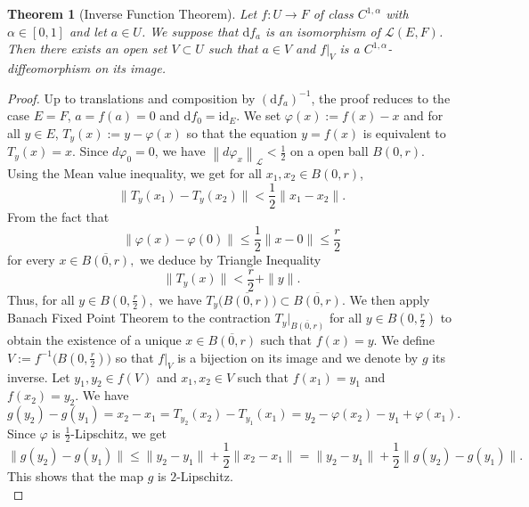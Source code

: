 \documentclass[11pt,reqno,a4paper]{article}%
\newtheorem{theorem}{Theorem}[section]
\theoremstyle{definition}
\theoremstyle{remark}
\renewcommand{\leq}{\leqslant}
\newcommand{\opnorm}[1]{{\left\| #1 \right\|}_{\mathcal{L}}}
\renewcommand{\d}{\mathrm{d}}
\renewcommand{\d}{\mathrm{d}}
\begin{document}
\begin{theorem}[Inverse Function Theorem] \label{theo: inverse_function}
    Let $f : U \to F$ of class $C^{1,\alpha}$ with $\alpha \in [ 0 , 1]$ and let $a \in U$. We suppose that $\d f_a$ is an isomorphism of $\mathscr{L}(E,F)$. Then there exists an open set $V \subset U$ such that $a \in V$ and $f \vert_V$ is a $C^{1,\alpha}$-diffeomorphism on its image.
\end{theorem}

\begin{proof}
    Up to translations and composition by $ (\d f_a)^{-1} $, the proof reduces to the case $E = F$, $a = f(a) = 0$ and $\d f_0 = \mathrm{id}_E$.
    We set $\varphi(x) := f(x) - x$ and for all $y \in E$, $T_y(x) := y - \varphi(x)$ so that the equation $y = f(x)$ is equivalent to $T_y(x) = x.$
    Since $d\varphi_0 = 0$, we have $ \opnorm{ d\varphi_x } < \frac{1}{2}$ on a open ball $B(0,r)$. Using the Mean value inequality, we get for all $x_1,x_2 \in B(0,r)$,
   $$ \| T_y(x_1) - T_y(x_2) \| < \frac{1}{2} \| x_1 - x_2\|.$$
From the fact that
    $$\| \varphi(x) - \varphi(0) \| \leq \frac{1}{2} \| x-0 \| \leq \frac{r}{2}$$
for every $x \in \overline{B(0,r)},$ we deduce by Triangle Inequality
    $$\| T_y(x) \| < \frac{r}{2} + \|y\|.$$
Thus, for all $y \in B(0,\frac{r}{2}),$ we have $T_y \big( \overline{B(0,r)} \big) \subset \overline{B(0,r)}$.
We then apply Banach Fixed Point Theorem to the contraction $T_y |_{\overline{B(0,r)}}$ for all $y \in B(0,\frac{r}{2})$ to obtain the existence of a unique $x \in \overline{B(0,r)}$ such that $f(x) = y$. We define $V := f^{-1} \big(  B(0,\frac{r}{2}) \big)$ so that $f |_V$ is a bijection on its image and we denote by $g$ its inverse. 
Let $y_1,y_2 \in f(V)$ and $x_1,x_2 \in V$ such that $f(x_1) = y_1$ and $f(x_2) = y_2$.
    We have
    \[ g(y_2) - g(y_1) = x_2 - x_1 = T_{y_2}(x_2) - T_{y_1}(x_1) = y_2 - \varphi(x_2) - y_1 + \varphi(x_1) .\]
    Since $\varphi$ is $\frac{1}{2}$-Lipschitz, we get
    \[ \| g(y_2) - g(y_1) \| \leq \| y _2 - y_1 \| + \frac{1}{2} \| x_2 - x_1\| = \| y _2 - y_1 \| + \frac{1}{2} \| g(y_2) - g(y_1) \|. \]
This shows that the map $g$ is $2$-Lipschitz.\\ 


\end{proof}
\end{document}
